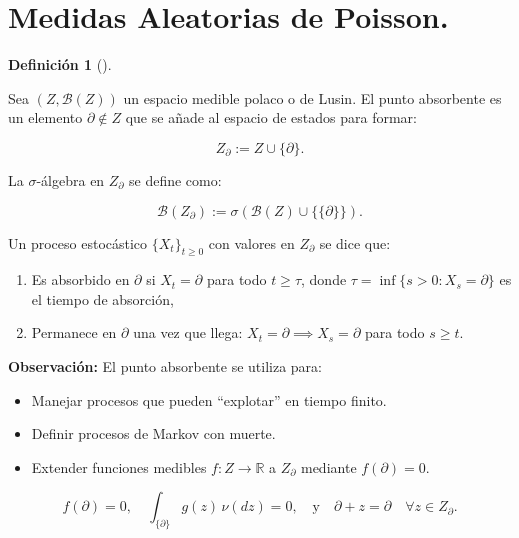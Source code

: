 \documentclass[
  spanish,
  us-letterpaper,
]{scrreprt}
\providecommand{\tightlist}{%
  \setlength{\itemsep}{0pt}\setlength{\parskip}{0pt}}
\theoremstyle{plain}
\theoremstyle{plain}
\theoremstyle{definition}
\newtheorem{definition}{Definición}[chapter]
\theoremstyle{remark}
\begin{document}
\section{Medidas Aleatorias de
Poisson.}\label{sec-medida_aleatoria_poisson}

\begin{definition}[]\protect\hypertarget{def-punto_absorbente}{}\label{def-punto_absorbente}

Sea \((Z, \mathcal{B}(Z))\) un espacio medible polaco o de Lusin. El
punto absorbente es un elemento \(\partial \notin Z\) que se añade al
espacio de estados para formar:

\[Z_\partial := Z \cup \{\partial\}.\]

La \(\sigma\)-álgebra en \(Z_\partial\) se define como:

\[\mathcal{B}(Z_\partial) := \sigma\left(\mathcal{B}(Z) \cup \{\{\partial\}\}\right).\]

Un proceso estocástico \(\{X_t\}_{t \geq 0}\) con valores en
\(Z_\partial\) se dice que:

\begin{enumerate}
\def\labelenumi{\arabic{enumi}.}
\tightlist
\item
  Es absorbido en \(\partial\) si \(X_t = \partial\) para todo
  \(t \geq \tau\), donde \(\tau = \inf\{s > 0 : X_s = \partial\}\) es el
  tiempo de absorción,
\item
  Permanece en \(\partial\) una vez que llega:
  \(X_t = \partial \implies X_s = \partial\) para todo \(s \geq t\).
\end{enumerate}

\end{definition}

\textbf{Observación:} El punto absorbente se utiliza para:

\begin{itemize}
\tightlist
\item
  Manejar procesos que pueden ``explotar'' en tiempo finito.
\item
  Definir procesos de Markov con muerte.
\item
  Extender funciones medibles \(f: Z \to \mathbb{R}\) a \(Z_\partial\)
  mediante \(f(\partial) = 0\).
\end{itemize}

\[f(\partial) = 0, \quad \int_{\{\partial\}} g(z) \, \nu(dz) = 0, \quad \text{y} \quad \partial + z = \partial \quad \forall z \in Z_\partial.\]
\end{document}
